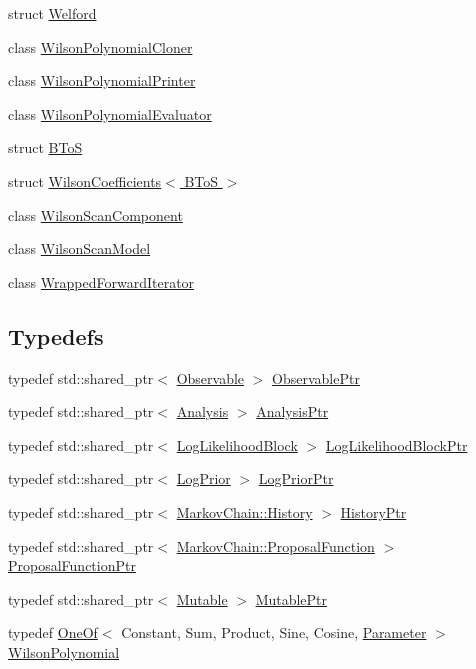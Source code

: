 \begin{DoxyCompactItemize}
\item 
struct \hyperlink{structeos_1_1Welford}{Welford}
\item 
class \hyperlink{classeos_1_1WilsonPolynomialCloner}{WilsonPolynomialCloner}
\item 
class \hyperlink{classeos_1_1WilsonPolynomialPrinter}{WilsonPolynomialPrinter}
\item 
class \hyperlink{classeos_1_1WilsonPolynomialEvaluator}{WilsonPolynomialEvaluator}
\item 
struct \hyperlink{structeos_1_1BToS}{BToS}
\item 
struct \hyperlink{structeos_1_1WilsonCoefficients_3_01BToS_01_4}{WilsonCoefficients$<$ BToS $>$}
\item 
class \hyperlink{classeos_1_1WilsonScanComponent}{WilsonScanComponent}
\item 
class \hyperlink{classeos_1_1WilsonScanModel}{WilsonScanModel}
\item 
class \hyperlink{classeos_1_1WrappedForwardIterator}{WrappedForwardIterator}
\end{DoxyCompactItemize}
\subsection*{Typedefs}
\begin{DoxyCompactItemize}
\item 
typedef std::shared\_\-ptr$<$ \hyperlink{classeos_1_1Observable}{Observable} $>$ \hyperlink{namespaceeos_a470e5dd806bd129080f1aa0c2954646f}{ObservablePtr}
\item 
typedef std::shared\_\-ptr$<$ \hyperlink{classeos_1_1Analysis}{Analysis} $>$ \hyperlink{namespaceeos_afc57020492535ccdd85cfc3b7421340d}{AnalysisPtr}
\item 
typedef std::shared\_\-ptr$<$ \hyperlink{classeos_1_1LogLikelihoodBlock}{LogLikelihoodBlock} $>$ \hyperlink{namespaceeos_ab823a6782e060c440e05a614158ad1bf}{LogLikelihoodBlockPtr}
\item 
typedef std::shared\_\-ptr$<$ \hyperlink{classeos_1_1LogPrior}{LogPrior} $>$ \hyperlink{namespaceeos_ac5481e3b46ee55ff24606ee7f6e78651}{LogPriorPtr}
\item 
typedef std::shared\_\-ptr$<$ \hyperlink{structeos_1_1MarkovChain_1_1History}{MarkovChain::History} $>$ \hyperlink{namespaceeos_ac9f30fde04446cfabdd69d4b5b5d3c5a}{HistoryPtr}
\item 
typedef std::shared\_\-ptr$<$ \hyperlink{structeos_1_1MarkovChain_1_1ProposalFunction}{MarkovChain::ProposalFunction} $>$ \hyperlink{namespaceeos_ae97f9891c67c90959a03fc96efaa4dc9}{ProposalFunctionPtr}
\item 
typedef std::shared\_\-ptr$<$ \hyperlink{classeos_1_1Mutable}{Mutable} $>$ \hyperlink{namespaceeos_a0ab446e6a801d96a1ee83bb7c070686f}{MutablePtr}
\item 
typedef \hyperlink{classeos_1_1OneOf}{OneOf}$<$ Constant, Sum, Product, Sine, Cosine, \hyperlink{classeos_1_1Parameter}{Parameter} $>$ \hyperlink{namespaceeos_ad0c57fa62d09f6465421603cb5285284}{WilsonPolynomial}
\end{DoxyCompactItemize}
